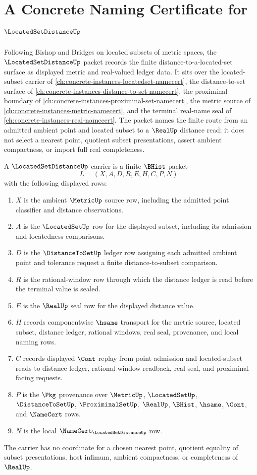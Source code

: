 \chapter{A Concrete Naming Certificate for $\LocatedSetDistanceUp$}
\label{ch:concrete-instances-located-set-distance-namecert}

Following Bishop and Bridges on located subsets of metric spaces, the $\LocatedSetDistanceUp$ packet records the finite distance-to-a-located-set surface as displayed metric and real-valued ledger data. It sits over the located-subset carrier of \autoref{ch:concrete-instances-locatedset-namecert}, the distance-to-set surface of \autoref{ch:concrete-instances-distance-to-set-namecert}, the proximinal boundary of \autoref{ch:concrete-instances-proximinal-set-namecert}, the metric source of \autoref{ch:concrete-instances-metric-namecert}, and the terminal real-name seal of \autoref{ch:concrete-instances-real-namecert}. The packet names the finite route from an admitted ambient point and located subset to a $\RealUp$ distance read; it does not select a nearest point, quotient subset presentations, assert ambient compactness, or import full real completeness.

\begin{definition}
\label{def:located-set-distance-carrier}
A $\LocatedSetDistanceUp$ carrier is a finite $\BHist$ packet
$$
L=(X,A,D,R,E,H,C,P,N)
$$
with the following displayed rows:
\begin{enumerate}
\item $X$ is the ambient $\MetricUp$ source row, including the admitted point classifier and distance observations.
\item $A$ is the $\LocatedSetUp$ row for the displayed subset, including its admission and locatedness comparisons.
\item $D$ is the $\DistanceToSetUp$ ledger row assigning each admitted ambient point and tolerance request a finite distance-to-subset comparison.
\item $R$ is the rational-window row through which the distance ledger is read before the terminal value is sealed.
\item $E$ is the $\RealUp$ seal row for the displayed distance value.
\item $H$ records componentwise $\hsame$ transport for the metric source, located subset, distance ledger, rational windows, real seal, provenance, and local naming rows.
\item $C$ records displayed $\Cont$ replay from point admission and located-subset reads to distance ledger, rational-window readback, real seal, and proximinal-facing requests.
\item $P$ is the $\Pkg$ provenance over $\MetricUp$, $\LocatedSetUp$, $\DistanceToSetUp$, $\ProximinalSetUp$, $\RealUp$, $\BHist$, $\hsame$, $\Cont$, and $\NameCert$ rows.
\item $N$ is the local $\NameCert_{\LocatedSetDistanceUp}$ row.
\end{enumerate}
The carrier has no coordinate for a chosen nearest point, quotient equality of subset presentations, host infimum, ambient compactness, or completeness of $\RealUp$.
\end{definition}

